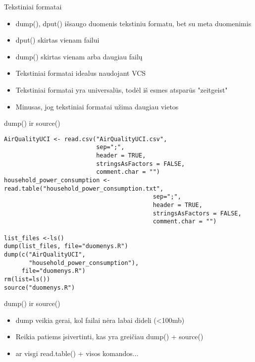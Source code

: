 \documentclass[11pt,xcolor=table]{beamer}
\begin{document}
\begin{frame}[fragile]{Tekstiniai formatai}
\begin{itemize}
\item dump(), dput() išsaugo duomenis tekstiniu formatu, bet su meta duomenimis
\item dput() skirtas vienam failui
\item dump() skirtas vienam arba daugiau failų
\item Tekstiniai formatai idealus naudojant VCS
\item Tekstiniai formatai yra universalūs, todėl iš esmes atsparūs "zeitgeist"
\item Minusas, jog tekstiniai formatai užima daugiau vietos
\end{itemize}
\end{frame}

\begin{frame}[fragile]{dump() ir source()}
\begin{lstlisting}
AirQualityUCI <- read.csv("AirQualityUCI.csv", 
                          sep=";", 
                          header = TRUE, 
                          stringsAsFactors = FALSE, 
                          comment.char = "")
household_power_consumption <- read.table("household_power_consumption.txt", 
                                          sep=";", 
                                          header = TRUE, 
                                          stringsAsFactors = FALSE, 
                                          comment.char = "")

list_files <-ls()
dump(list_files, file="duomenys.R")
dump(c("AirQualityUCI", 
       "household_power_consumption"), 
     file="duomenys.R")
rm(list=ls())
source("duomenys.R")
\end{lstlisting}
\end{frame}

\begin{frame}[fragile]{dump() ir source()}
\begin{itemize}
\item dump veikia gerai, kol failai nėra labai dideli (<100mb)
\item Reikia patiems įsivertinti, kas yra greičiau dump() + source()
\item ar visgi read.table() + visos komandos...
\end{itemize}
\end{frame}
\end{document}

